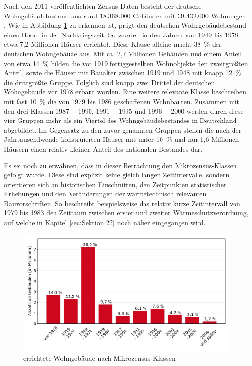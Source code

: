 Nach den 2011 veröffentlichten Zensus Daten besteht der deutsche Wohngebäudebestand aus rund 18.368.000 Gebäuden mit 39.432.000 Wohnungen \cite{.2015}.
Wie in Abbildung \ref{fig: Abbildung211} zu erkennen ist, prägt den deutschen Wohngebäudebestand einen Boom in der Nachkriegszeit. 
So wurden in den Jahren von 1949 bis 1978 etwa 7,2 Millionen Häuser errichtet. Diese Klasse alleine macht \mbox{38 \%} der deutschen Wohngebäude aus. 
Mit ca. 2,7 Millionen Gebäuden und einem Anteil von etwa \mbox{14 \%} bilden die vor 1919 fertiggestellten Wohnobjekte den zweitgrößten Anteil, sowie die Häuser mit Baualter zwischen 1919 und 1948 mit knapp \mbox{12 \%} die drittgrößte Gruppe.
Folglich sind knapp zwei Drittel der deutschen Wohngebäude vor 1978 erbaut worden.
Eine weitere relevante Klasse beschreiben mit fast \mbox{10 \%} die von 1979 bis 1986 geschaffenen Wohnbauten. 
Zusammen mit den drei Klassen \mbox{1987 - 1990,} \mbox{1991 - 1995} und \mbox{1996 - 2000} werden  durch diese vier Gruppen mehr als ein Viertel des Wohngebäudebestandes in Deutschland abgebildet.
Im Gegensatz zu den zuvor genannten Gruppen stellen die nach der Jahrtausendwende konstruierten Häuser mit unter \mbox{10 \%} und nur 1,6 Millionen Häusern einen relativ kleinen Anteil des nationalen Bestandes dar. 

Es sei noch zu erwähnen, dass in dieser Betrachtung den Mikrozensus-Klassen gefolgt wurde. 
Diese sind explizit keine gleich langen Zeitintervalle, sondern \glqq orientieren sich an historischen Einschnitten, den Zeitpunkten statistischer Erhebungen und den Veränderungen der wärmetechnisch relevanten Bauvorschriften\grqq \cite{.2015}. 
So beschreibt beispielsweise das relativ kurze Zeitintervall von 1979 bis 1983 den Zeitraum zwischen erster und zweiter Wärmeschutzverordnung, auf welche in Kapitel \ref{sec:Sektion 22} noch näher eingegangen wird.

\begin{figure}[H]
	\centering
		\includegraphics{Pictures/GebaeudeAlterDiagramm.jpg}
	\caption{errichtete Wohngebäude nach Mikrozensus-Klassen  	\cite{StatistischeAmterdesBundesundderLander.2014}}
	\label{fig: Abbildung211} 
\end{figure}

